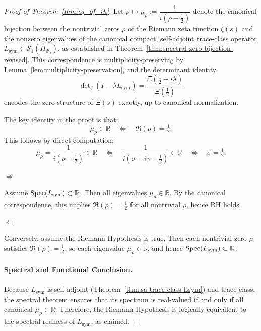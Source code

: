 \begin{proof}[Proof of Theorem~\ref{thm:eq_of_rh}]
Let \( \rho \mapsto \mu_\rho := \dfrac{1}{i(\rho - \tfrac{1}{2})} \) denote the canonical bijection between the nontrivial zeros \( \rho \) of the Riemann zeta function \( \zeta(s) \) and the nonzero eigenvalues of the canonical compact, self-adjoint trace-class operator \( L_{\mathrm{sym}} \in \mathcal{S}_1(H_{\Psi_\alpha}) \), as established in Theorem~\ref{thm:spectral-zero-bijection-revised}. This correspondence is multiplicity-preserving by Lemma~\ref{lem:multiplicity-preservation}, and the determinant identity
\[
\det\nolimits_\zeta(I - \lambda L_{\mathrm{sym}}) = \frac{\Xi\left(\tfrac{1}{2} + i\lambda\right)}{\Xi\left(\tfrac{1}{2}\right)}
\]
encodes the zero structure of \( \Xi(s) \) exactly, up to canonical normalization.

The key identity in the proof is that:
\[
\mu_\rho \in \mathbb{R}
\quad \Longleftrightarrow \quad
\Re(\rho) = \tfrac{1}{2}.
\]
This follows by direct computation:
\[
\mu_\rho = \frac{1}{i(\rho - \tfrac{1}{2})} \in \mathbb{R}
\quad \Longleftrightarrow \quad
\frac{1}{i(\sigma + i\gamma - \tfrac{1}{2})} \in \mathbb{R}
\quad \Longleftrightarrow \quad
\sigma = \tfrac{1}{2}.
\]

\paragraph{\( \Rightarrow \)}  
Assume \( \operatorname{Spec}(L_{\mathrm{sym}}) \subset \mathbb{R} \). Then all eigenvalues \( \mu_\rho \in \mathbb{R} \). By the canonical correspondence, this implies \( \Re(\rho) = \tfrac{1}{2} \) for all nontrivial \( \rho \), hence RH holds.

\paragraph{\( \Leftarrow \)}  
Conversely, assume the Riemann Hypothesis is true. Then each nontrivial zero \( \rho \) satisfies \( \Re(\rho) = \tfrac{1}{2} \), so each eigenvalue \( \mu_\rho \in \mathbb{R} \), and hence \( \operatorname{Spec}(L_{\mathrm{sym}}) \subset \mathbb{R} \).

\paragraph{Spectral and Functional Conclusion.}
Because \( L_{\mathrm{sym}} \) is self-adjoint (Theorem~\ref{thm:sa-trace-class-Lsym}) and trace-class, the spectral theorem ensures that its spectrum is real-valued if and only if all canonical \( \mu_\rho \in \mathbb{R} \). Therefore, the Riemann Hypothesis is logically equivalent to the spectral realness of \( L_{\mathrm{sym}} \), as claimed.
\end{proof}
%  